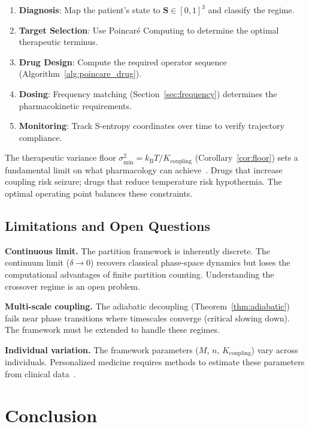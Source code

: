\documentclass[10pt,twocolumn]{article}
\theoremstyle{remark}
\newcommand{\Scoord}{\mathbf{S}}
\newcommand{\kB}{k_{\mathrm{B}}}
\begin{document}
\begin{enumerate}[noitemsep]
\item \textbf{Diagnosis}: Map the patient's state to $\Scoord \in [0,1]^3$ and classify the regime.
\item \textbf{Target Selection}: Use Poincar\'{e} Computing to determine the optimal therapeutic terminus.
\item \textbf{Drug Design}: Compute the required operator sequence (Algorithm~\ref{alg:poincare_drug}).
\item \textbf{Dosing}: Frequency matching (Section~\ref{sec:frequency}) determines the pharmacokinetic requirements.
\item \textbf{Monitoring}: Track S-entropy coordinates over time to verify trajectory compliance.
\end{enumerate}

The therapeutic variance floor $\sigma^2_{\min} = \kB T / K_{\mathrm{coupling}}$ (Corollary~\ref{cor:floor}) sets a fundamental limit on what pharmacology can achieve~\cite{stahl2013psychopharmacology,cipriani2018comparative}. Drugs that increase coupling risk seizure; drugs that reduce temperature risk hypothermia. The optimal operating point balances these constraints.

\subsection{Limitations and Open Questions}

\textbf{Continuous limit.} The partition framework is inherently discrete. The continuum limit ($\delta \to 0$) recovers classical phase-space dynamics but loses the computational advantages of finite partition counting. Understanding the crossover regime is an open problem.

\textbf{Multi-scale coupling.} The adiabatic decoupling (Theorem~\ref{thm:adiabatic}) fails near phase transitions where timescales converge (critical slowing down). The framework must be extended to handle these regimes.

\textbf{Individual variation.} The framework parameters ($M$, $n$, $K_{\mathrm{coupling}}$) vary across individuals. Personalized medicine requires methods to estimate these parameters from clinical data~\cite{goldberger2000physiobank,markiewicz2021openneuro}.

\section{Conclusion}
\label{sec:conclusion}
\end{document}
